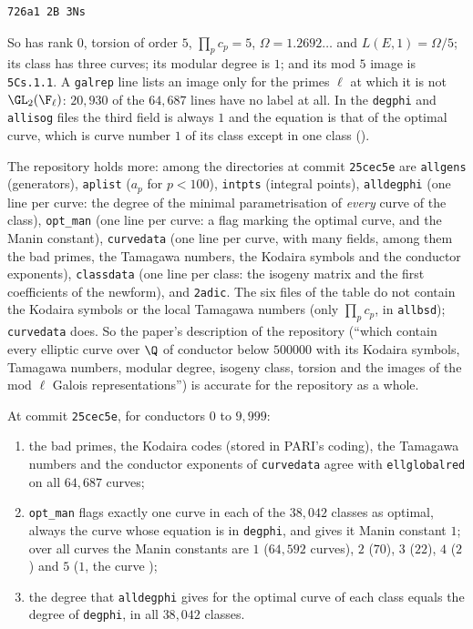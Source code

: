 \begin{sloppypar}
\begin{definition}
\begin{lstlisting}
726a1 2B 3Ns
\end{lstlisting}
So  has rank $0$, torsion of order $5$, $\prod_pc_p=5$, $\Omega=1.2692\dots$ and $L(E,1)=\Omega/5$; its class has three curves; its
modular degree is $1$; and its mod $5$ image is \texttt{5Cs.1.1}. A \texttt{galrep} line lists an image only for the primes $\ell$ at which it is
not $\GL_2(\F_\ell)$: $20{,}930$ of the $64{,}687$ lines have no label at all. In the \texttt{degphi} and \texttt{allisog} files the third field is always
$1$ and the equation is that of the optimal curve, which is curve number $1$ of its class except in one class ().
\end{definition}

The repository holds more: among the directories at commit \texttt{25cec5e} are \texttt{allgens} (generators), \texttt{aplist}
($a_p$ for $p<100$), \texttt{intpts} (integral points), \texttt{alldegphi} (one line per curve: the degree of the minimal parametrisation of
\emph{every} curve of the class), \texttt{opt\_man} (one line per curve: a flag marking the optimal curve, and the Manin constant),
\texttt{curvedata} (one line per curve, with many fields, among them the bad primes, the Tamagawa numbers, the Kodaira symbols and the
conductor exponents), \texttt{classdata} (one line per class: the isogeny matrix and the first coefficients of the newform), and \texttt{2adic}. The six files of the table do not contain the Kodaira symbols
or the local Tamagawa numbers (only $\prod_pc_p$, in \texttt{allbsd}); \texttt{curvedata} does. So the paper's description of the
repository (``which contain every elliptic curve over $\Q$ of conductor below $500000$ with its Kodaira symbols, Tamagawa numbers, modular
degree, isogeny class, torsion and the images of the mod $\ell$ Galois representations'') is accurate for the repository as a whole.

\begin{example}\label{ex:computation:curvedata}
At commit \texttt{25cec5e}, for conductors $0$ to $9{,}999$:
\begin{enumerate}[label=(\alph*)]
\item the bad primes, the Kodaira codes (stored in PARI's coding), the Tamagawa numbers and the conductor exponents of \texttt{curvedata}
agree with \texttt{ellglobalred} on all $64{,}687$ curves;
\item \texttt{opt\_man} flags exactly one curve in each of the $38{,}042$ classes as optimal, always the curve whose equation is in
\texttt{degphi}, and gives it Manin constant $1$; over all curves the Manin constants are $1$ ($64{,}592$ curves), $2$ ($70$), $3$ ($22$), $4$ ($2$)
and $5$ ($1$, the curve );
\item the degree that \texttt{alldegphi} gives for the optimal curve of each class equals the degree of \texttt{degphi}, in all $38{,}042$ classes.
\end{enumerate}
\end{example}


\end{sloppypar}
